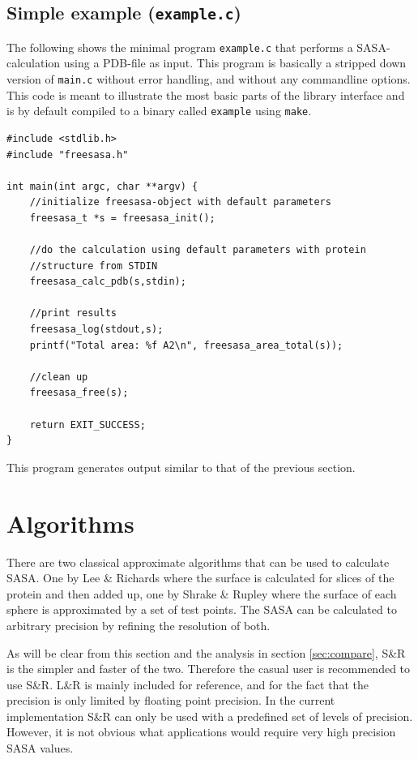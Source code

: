 \documentclass[a4paper,11pt]{article}
\begin{document}
\subsection{Simple example (\texttt{example.c})}\label{sec:simple_sample}

The following shows the minimal program \verb|example.c| that performs
a SASA-calculation using a PDB-file as input. This program is
basically a stripped down version of \verb|main.c| without error
handling, and without any commandline options. This code is meant to
illustrate the most basic parts of the library interface and is by
default compiled to a binary called \verb|example| using \verb|make|.

\begin{verbatim}
#include <stdlib.h>
#include "freesasa.h"

int main(int argc, char **argv) { 
    //initialize freesasa-object with default parameters
    freesasa_t *s = freesasa_init();

    //do the calculation using default parameters with protein
    //structure from STDIN
    freesasa_calc_pdb(s,stdin);

    //print results
    freesasa_log(stdout,s);
    printf("Total area: %f A2\n", freesasa_area_total(s));

    //clean up
    freesasa_free(s);

    return EXIT_SUCCESS;
}
\end{verbatim}
This program generates output similar to that of the previous
section.

\section{Algorithms}\label{sec:alg}

There are two classical approximate algorithms that can be used to
calculate SASA. One by Lee \& Richards \cite{LnR} where the surface is
calculated for slices of the protein and then added up, one by Shrake
\& Rupley \cite{SnR} where the surface of each sphere is approximated
by a set of test points. The SASA can be calculated to arbitrary
precision by refining the resolution of both.

As will be clear from this section and the analysis in section
\ref{sec:compare}, S\&R is the simpler and faster of the
two. Therefore the casual user is recommended to use S\&R. L\&R is
mainly included for reference, and for the fact that the precision is
only limited by floating point precision. In the current
implementation S\&R can only be used with a predefined set of levels
of precision. However, it is not obvious what applications would
require very high precision SASA values.
\end{document}
